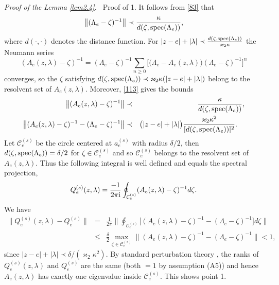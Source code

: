 \documentclass[letterpaper,onecolumn,11pt,accepted=2021-12-09]{quantumarticle}
\numberwithin{equation}{section}
\newcommand{\aes}{a_e^{(s)}}
\newcommand{\Qes}{Q_e^{(s)}}
\renewcommand{\i}{{\rm i}}
\begin{document}
{\em Proof of the Lemma \ref{lem2.4}.\ } Proof of 1. It follows from \eqref{83} that 
\begin{equation}
	\big\| (\Lambda_e-\zeta)^{-1}\big\| \prec\frac{\kappa}{d(\zeta,{\rm spec}(\Lambda_e))},
	\label{112}
\end{equation}
where $d(\cdot,\cdot)$ denotes the distance function. For $|z-e|+ |\lambda| \prec \frac{d(\zeta,{\rm spec}(\Lambda_e))}{\varkappa_2\kappa}$ the Neumann series 
\begin{equation}
	(A_e(z,\lambda) -\zeta)^{-1} = (\Lambda_e-\zeta)^{-1}\sum_{n\ge 0} \big[ \big(\Lambda_e-A_e(z,\lambda)\big) (\Lambda_e-\zeta)^{-1}\big]^n
	\label{113}
\end{equation}
converges, so the $\zeta$ satisfying $d(\zeta,{\rm spec}(\Lambda_e)) \prec \varkappa_2\kappa(|z-e|+ |\lambda|)$ belong to the resolvent set of $A_e(z,\lambda)$. Moreover, \eqref{113}  gives the bounds
\begin{eqnarray}
\big\|  (A_e(z,\lambda) -\zeta)^{-1}\big\|  &\prec&  \frac{\kappa}{d(\zeta,{\rm spec}(\Lambda_e))},
	\label{113.1}	\\
\big\| (A_e(z,\lambda) -\zeta)^{-1} - (\Lambda_e-\zeta)^{-1} \big\| &\prec& \big(|z-e|+|\lambda|\big) \frac{\varkappa_2 \kappa^2}{[d(\zeta,{\rm spec}(\Lambda_e))]^2}\label{113.2}.\quad 
\end{eqnarray}
Let ${\mathcal C}_e^{(s)}$ be the circle centered at $\aes$ with radius $\delta/2$, then $d(\zeta,{\rm spec}(\Lambda_e))=\delta/2$ for $\zeta\in{\mathcal C}_e^{(s)}$ and so ${\mathcal C}_e^{(s)}$ belongs to the resolvent set of $A_e(z,\lambda)$. Thus  the following integral is well defined and equals the spectral projection, 
\begin{equation}
	\Qes(z,\lambda) = \frac{-1}{2\pi\i}\oint_{{\mathcal C}_e^{(s)}} (A_e(z,\lambda) - \zeta)^{-1} d\zeta.
	\label{115}
\end{equation}
We have 
\begin{eqnarray}
	\|\Qes(z,\lambda)-\Qes\| &=&\frac{1}{2\pi}\big\| \oint_{{\mathcal C}_e^{(s)}} \big[(A_e(z,\lambda) -\zeta)^{-1} - (\Lambda_e-\zeta)^{-1}\big] d\zeta\big\| \nonumber\\
	&\le&\frac\delta2 \max_{\zeta \in {\mathcal C}_e^{(s)}} \big\| (A_e(z,\lambda) -\zeta)^{-1} - (\Lambda_e-\zeta)^{-1}\big\| < 1,
\end{eqnarray}
since $|z-e|+|\lambda| \prec \delta/(\varkappa_2\kappa^2)$. By standard perturbation theory \cite{Kato}, the ranks of $\Qes(z,\lambda)$ and $\Qes$ are the same (both $=1$ by assumption (A5)) and hence $A_e(z,\lambda)$ has exactly one eigenvalue inside ${\mathcal C}_e^{(s)}$. This shows point 1. 
\end{document}

